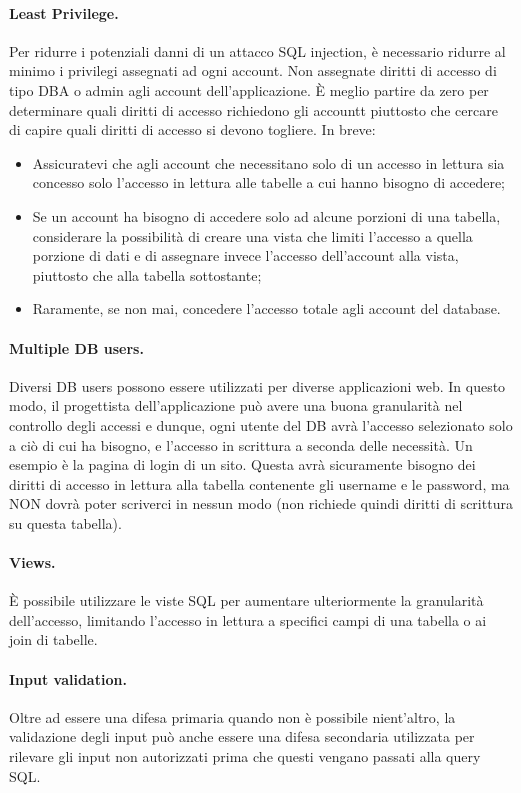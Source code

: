 \paragraph{Least Privilege.}
Per ridurre i potenziali danni di un attacco SQL injection, è necessario ridurre
al minimo i
privilegi assegnati ad ogni account. Non assegnate diritti di accesso di tipo DBA
o admin agli
account dell'applicazione. È meglio partire da zero per determinare quali diritti
di accesso
richiedono gli accountt piuttosto che cercare di capire quali diritti di accesso
si devono togliere.
In breve:

\begin{itemize}
    \item Assicuratevi che agli account che necessitano solo di un accesso in
          lettura sia
          concesso solo l'accesso in lettura alle tabelle a cui hanno bisogno di accedere;
    \item Se un account ha bisogno di accedere solo ad alcune porzioni di una
          tabella,
          considerare la possibilità di creare una vista che limiti l'accesso a quella
          porzione di
          dati e di assegnare invece l'accesso dell'account alla vista, piuttosto che
          alla tabella sottostante;
    \item Raramente, se non mai, concedere l'accesso totale agli account del
          database.
\end{itemize}

\paragraph{Multiple DB users.}
Diversi DB users possono essere utilizzati per diverse applicazioni web.
In questo modo, il progettista dell'applicazione può avere una buona granularità
nel controllo degli accessi e dunque,
ogni utente del DB avrà l'accesso selezionato solo a ciò di cui ha bisogno, e
l'accesso in scrittura a seconda delle necessità. Un esempio è la pagina di login
di un sito. Questa avrà sicuramente bisogno dei diritti di accesso in lettura alla
tabella contenente gli username e le password, ma NON dovrà poter scriverci in
nessun modo (non richiede quindi diritti di scrittura su questa tabella).

\paragraph{Views.}
È possibile utilizzare le viste SQL per aumentare ulteriormente la granularità
dell'accesso, limitando l'accesso in lettura a specifici campi di una tabella o
ai join di tabelle.

\paragraph{Input validation.}
Oltre ad essere una difesa primaria quando non è possibile nient'altro,
la validazione degli
input può anche essere una difesa secondaria utilizzata per rilevare gli input
non autorizzati
prima che questi vengano passati alla query SQL.